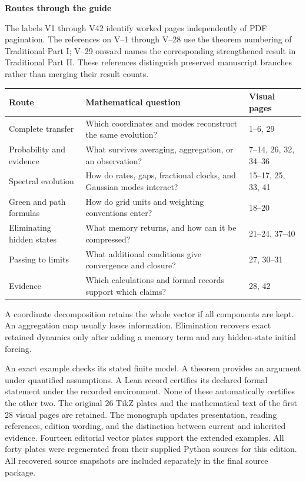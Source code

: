 
{\sffamily\bfseries\Large\color{accent}Routes through the guide\par}\vspace{12pt}
The labels V1 through V42 identify worked pages independently of PDF pagination. The references on V--1 through V--28 use the theorem numbering of Traditional Part I; V--29 onward names the corresponding strengthened result in Traditional Part II. These references distinguish preserved manuscript branches rather than merging their result counts.
\begin{center}\small
\begin{tabularx}{\linewidth}{@{}p{1.6in}Yl@{}}\toprule
Route & Mathematical question & Visual pages\\\midrule
Complete transfer & Which coordinates and modes reconstruct the same evolution? & 1--6, 29\\
Probability and evidence & What survives averaging, aggregation, or an observation? & 7--14, 26, 32, 34--36\\
Spectral evolution & How do rates, gaps, fractional clocks, and Gaussian modes interact? & 15--17, 25, 33, 41\\
Green and path formulas & How do grid units and weighting conventions enter? & 18--20\\
Eliminating hidden states & What memory returns, and how can it be compressed? & 21--24, 37--40\\
Passing to limits & What additional conditions give convergence and closure? & 27, 30--31\\
Evidence & Which calculations and formal records support which claims? & 28, 42\\\bottomrule
\end{tabularx}
\end{center}
A coordinate decomposition retains the whole vector if all components are kept. An aggregation map usually loses information. Elimination recovers exact retained dynamics only after adding a memory term and any hidden-state initial forcing.

An exact example checks its stated finite model. A theorem provides an argument under quantified assumptions. A Lean record certifies its declared formal statement under the recorded environment. None of these automatically certifies the other two.
The original 26 TikZ plates and the mathematical text of the first 28 visual pages are retained. The monograph updates presentation, reading references, edition wording, and the distinction between current and inherited evidence. Fourteen editorial vector plates support the extended examples. All forty plates were regenerated from their supplied Python sources for this edition. All recovered source snapshots are included separately in the final source package.

